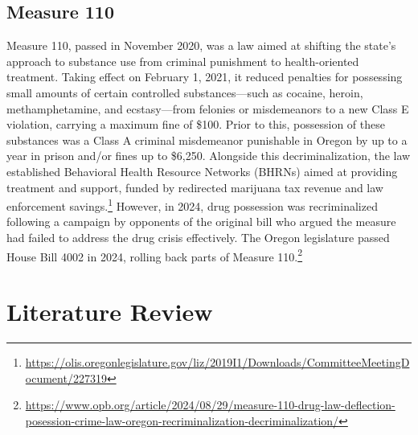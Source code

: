 \documentclass[12pt]{article}
\begin{document}
\subsection{Measure 110}

Measure 110, passed in November 2020, was a law aimed at shifting the
state's approach to substance use from criminal punishment to
health-oriented treatment. Taking effect on February 1, 2021, it reduced
penalties for possessing small amounts of certain controlled
substances---such as cocaine, heroin, methamphetamine, and ecstasy---from
felonies or misdemeanors to a new Class E violation, carrying a maximum
fine of \$100. Prior to this, possession of these substances was a Class A
criminal misdemeanor punishable in Oregon by up to a year in prison and/or
fines up to \$6{,}250. Alongside this decriminalization, the law
established Behavioral Health Resource Networks (BHRNs) aimed at providing
treatment and support, funded by redirected marijuana tax revenue and law
enforcement savings.\footnote{\url{https://olis.oregonlegislature.gov/liz/2019I1/Downloads/CommitteeMeetingDocument/227319}}
However, in 2024, drug possession was recriminalized following a campaign
by opponents of the original bill who argued the measure had failed to
address the drug crisis effectively. The Oregon legislature passed House
Bill 4002 in 2024, rolling back parts of Measure
110.\footnote{\url{https://www.opb.org/article/2024/08/29/measure-110-drug-law-deflection-posession-crime-law-oregon-recriminalization-decriminalization/}}

\section{Literature Review}
\end{document}
